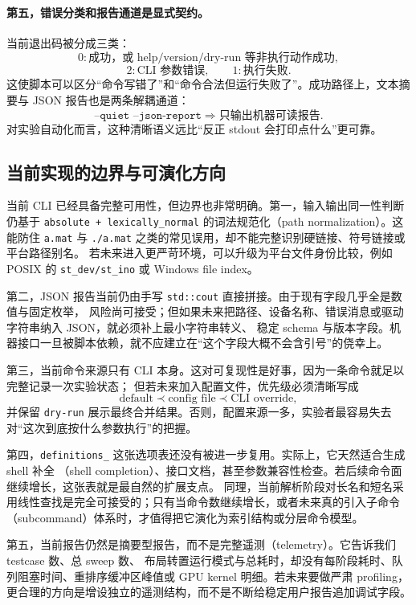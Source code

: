 \paragraph{第五，错误分类和报告通道是显式契约。}
当前退出码被分成三类：
\[
    0:\text{成功，或 help/version/dry-run 等非执行动作成功},
\]
\[
    2:\text{CLI 参数错误},
    \qquad
    1:\text{执行失败}.
\]
这使脚本可以区分“命令写错了”和“命令合法但运行失败了”。成功路径上，文本摘要与 JSON 报告也是两条解耦通道：
\[
    \texttt{--quiet --json-report}
    \Rightarrow
    \text{只输出机器可读报告}.
\]
对实验自动化而言，这种清晰语义远比“反正 stdout 会打印点什么”更可靠。

\subsection{当前实现的边界与可演化方向}

当前 CLI 已经具备完整可用性，但边界也非常明确。第一，输入输出同一性判断仍基于
\texttt{absolute + lexically\_normal} 的词法规范化（path normalization）。这能防住
\texttt{a.mat} 与 \texttt{./a.mat} 之类的常见误用，却不能完整识别硬链接、符号链接或平台路径别名。
若未来进入更严苛环境，可以升级为平台文件身份比较，例如 POSIX 的 \texttt{st\_dev/st\_ino} 或 Windows file index。

第二，JSON 报告当前仍由手写 \texttt{std::cout} 直接拼接。由于现有字段几乎全是数值与固定枚举，
风险尚可接受；但如果未来把路径、设备名称、错误消息或驱动字符串纳入 JSON，就必须补上最小字符串转义、
稳定 schema 与版本字段。机器接口一旦被脚本依赖，就不应建立在“这个字段大概不会含引号”的侥幸上。

第三，当前命令来源只有 CLI 本身。这对可复现性是好事，因为一条命令就足以完整记录一次实验状态；
但若未来加入配置文件，优先级必须清晰写成
\[
    \text{default}\prec \text{config file}\prec \text{CLI override},
\]
并保留 \texttt{dry-run} 展示最终合并结果。否则，配置来源一多，实验者最容易失去对“这次到底按什么参数执行”的把握。

第四，\texttt{definitions\_} 这张选项表还没有被进一步复用。实际上，它天然适合生成 shell 补全
（shell completion）、接口文档，甚至参数兼容性检查。若后续命令面继续增长，这张表就是最自然的扩展支点。
同理，当前解析阶段对长名和短名采用线性查找是完全可接受的；只有当命令数继续增长，或者未来真的引入子命令
（subcommand）体系时，才值得把它演化为索引结构或分层命令模型。

第五，当前报告仍然是摘要型报告，而不是完整遥测（telemetry）。它告诉我们 testcase 数、总 sweep 数、
布局转置运行模式与总耗时，却没有每阶段耗时、队列阻塞时间、重排序缓冲区峰值或 GPU kernel 明细。若未来要做严肃 profiling，
更合理的方向是增设独立的遥测结构，而不是不断给稳定用户报告追加调试字段。

